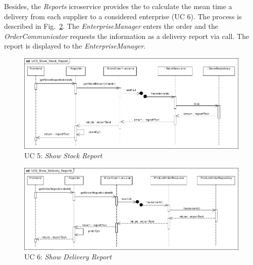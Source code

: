 		Besides, the \textit{Reports} icroservice provides the  to calculate the mean time a delivery  from each supplier to a considered enterprise (UC 6). 
		The process is described in Fig.~\ref{MS_UC6}. 
		The \textit{EnterpriseManager} enters the order  and the \textit{OrderCommunicator} requests the information as a delivery report via  call. 
		The report is displayed to the \textit{EnterpriseManager}.
		
	
			
			\begin{figure}[!h]
				\centering
				\includegraphics[width = 1\textwidth]{img/UC5_Show_Stock_Report.jpg}
				\caption{UC 5: \textit{Show Stock Report}}
				\label{MS_UC5}
			\end{figure}
			
			\begin{figure}[!h]
				\centering
				\includegraphics[width = 1\textwidth]{img/UC6_Show_Delivery_Reports.jpg}
				\caption{UC 6: \textit{Show Delivery Report}}
				\label{MS_UC6}
			\end{figure}
			
	\FloatBarrier
